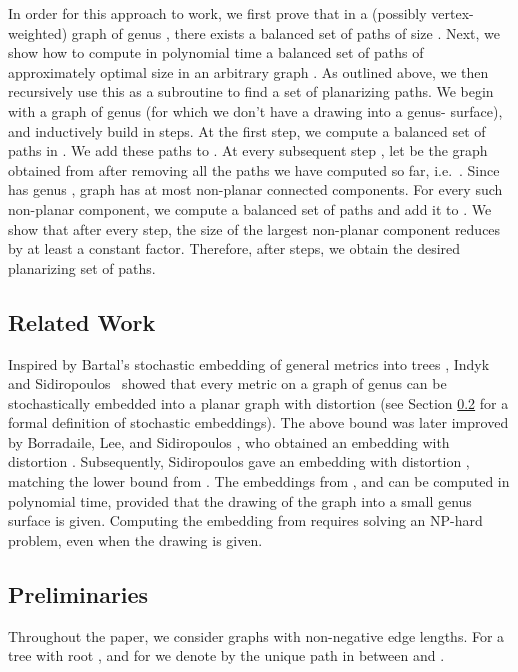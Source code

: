 \documentclass[envcountsect]{llncs}
\begin{document}
In order for this approach to work, we first prove that in a (possibly vertex-weighted) graph  of genus , 
there exists a balanced set  of paths of size .
Next, we show how to compute in polynomial time a balanced set of paths of approximately optimal size in an arbitrary graph .
As outlined above, we then recursively use this as a subroutine to find a set  of planarizing paths.
We begin with a graph  of genus  (for which we don't have a drawing into a genus- surface), and 
inductively build  in steps.
At the first step, we compute a balanced set  of paths in .
We add these paths to .
At every subsequent step , let  be the graph obtained from  after removing all the paths we have computed so far, i.e.~.
Since  has genus , graph  has at most  non-planar connected components.
For every such non-planar component, we compute a balanced set of paths and add it to .
We show that after every step, the size of the largest non-planar component reduces by at least a constant factor.
Therefore, after  steps, we obtain the desired planarizing set of paths.


\subsection{Related Work}

Inspired by Bartal's stochastic embedding of general metrics into
trees \cite{Bar96}, Indyk and Sidiropoulos~\cite{indyk_genus} showed that every metric on a graph of genus  can be stochastically embedded into a planar graph with distortion 
(see Section \ref{sec:prelims} for a formal definition of
stochastic embeddings).
The above bound was later improved by Borradaile, Lee, and Sidiropoulos \cite{BLS09}, who obtained an embedding with distortion .
Subsequently, Sidiropoulos \cite{sidiropoulos2010optimal} gave an embedding with distortion , matching the  lower bound from \cite{BLS09}.
The embeddings from \cite{indyk_genus}, and \cite{sidiropoulos2010optimal} can be computed in polynomial time, provided that the drawing of the graph into a small genus surface is given.
Computing the embedding from \cite{BLS09} requires solving an NP-hard problem, even when the drawing is given.


\subsection{Preliminaries}\label{sec:prelims}
Throughout the paper, we consider graphs
with non-negative edge lengths.
For a tree  with root , and for  we denote by  the unique path in  between  and .
\end{document}
